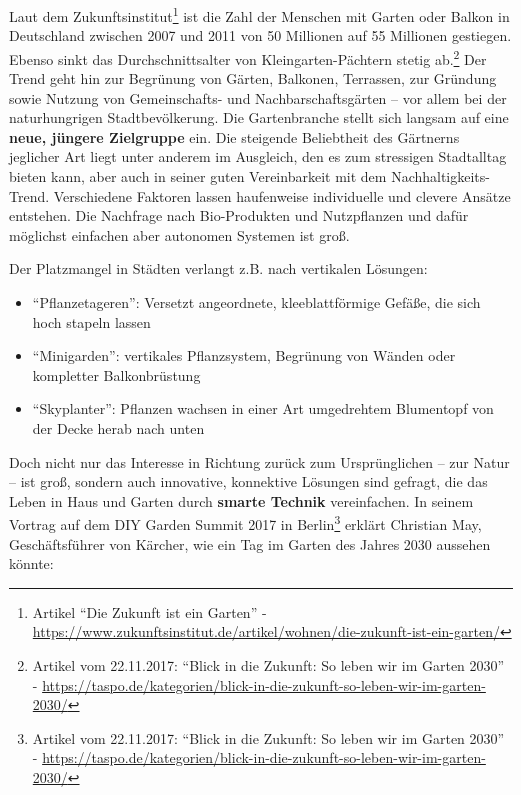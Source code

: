Laut dem Zukunftsinstitut\footnote{Artikel ``Die Zukunft ist ein
  Garten'' -
  \url{https://www.zukunftsinstitut.de/artikel/wohnen/die-zukunft-ist-ein-garten/}}
ist die Zahl der Menschen mit Garten oder Balkon in Deutschland zwischen
2007 und 2011 von 50 Millionen auf 55 Millionen gestiegen. Ebenso sinkt
das Durchschnittsalter von Kleingarten-Pächtern stetig ab.\footnote{Artikel
  vom 22.11.2017: ``Blick in die Zukunft: So leben wir im Garten 2030''
  -
  \url{https://taspo.de/kategorien/blick-in-die-zukunft-so-leben-wir-im-garten-2030/}}
Der Trend geht hin zur Begrünung von Gärten, Balkonen, Terrassen, zur
Gründung sowie Nutzung von Gemeinschafts- und Nachbarschaftsgärten --
vor allem bei der naturhungrigen Stadtbevölkerung. Die Gartenbranche
stellt sich langsam auf eine \textbf{neue, jüngere Zielgruppe} ein. Die
steigende Beliebtheit des Gärtnerns jeglicher Art liegt unter anderem im
Ausgleich, den es zum stressigen Stadtalltag bieten kann, aber auch in
seiner guten Vereinbarkeit mit dem Nachhaltigkeits-Trend. Verschiedene
Faktoren lassen haufenweise individuelle und clevere Ansätze entstehen.
Die Nachfrage nach Bio-Produkten und Nutzpflanzen und dafür möglichst
einfachen aber autonomen Systemen ist groß.

Der Platzmangel in Städten verlangt z.B. nach vertikalen Lösungen:

\begin{itemize}
\tightlist
\item
  ``Pflanzetageren'': Versetzt angeordnete, kleeblattförmige Gefäße, die
  sich hoch stapeln lassen\\
\item
  ``Minigarden'': vertikales Pflanzsystem, Begrünung von Wänden oder
  kompletter Balkonbrüstung\\
\item
  ``Skyplanter'': Pflanzen wachsen in einer Art umgedrehtem Blumentopf
  von der Decke herab nach unten
\end{itemize}

Doch nicht nur das Interesse in Richtung zurück zum Ursprünglichen --
zur Natur -- ist groß, sondern auch innovative, konnektive Lösungen sind
gefragt, die das Leben in Haus und Garten durch \textbf{smarte Technik}
vereinfachen. In seinem Vortrag auf dem DIY Garden Summit 2017 in
Berlin\footnote{Artikel vom 22.11.2017: ``Blick in die Zukunft: So leben
  wir im Garten 2030'' -
  \url{https://taspo.de/kategorien/blick-in-die-zukunft-so-leben-wir-im-garten-2030/}}
erklärt Christian May, Geschäftsführer von Kärcher, wie ein Tag im
Garten des Jahres 2030 aussehen könnte:

